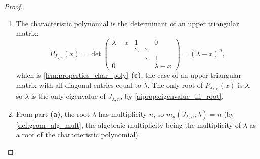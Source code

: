 \begin{proof}
\leavevmode
\begin{enumerate}[label=\textbf{(\alph*)}]
    \item The characteristic polynomial is the determinant of an upper triangular matrix:
    \[
    P_{J_{\lambda, n}}(x) = \det \begin{pmatrix} \lambda-x & 1 & & 0 \\ & \ddots & \ddots & \\ & & \ddots & 1 \\ 0 & & & \lambda-x \end{pmatrix} = (\lambda-x)^n,
    \]
    which is \cref{lem:properties_char_poly} \textbf{(c)}, the case of an upper triangular matrix with all diagonal entries equal to $\lambda$.
    The only root of $P_{J_{\lambda, n}}(x)$ is $\lambda$, so $\lambda$ is the only eigenvalue of $J_{\lambda, n}$, by \cref{aiprop:eigenvalue_iff_root}.

    \item From part \textbf{(a)}, the root $\lambda$ has multiplicity $n$, so $m_a(J_{\lambda, n}; \lambda) = n$ (by \cref{def:geom_alg_mult}, the algebraic multiplicity being the multiplicity of $\lambda$ as a root of the characteristic polynomial).
    

\end{enumerate}
\end{proof}
